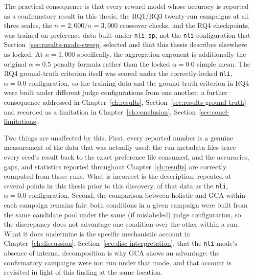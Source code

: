 The practical consequence is that every reward model whose accuracy is
reported as a confirmatory result in this thesis, the RQ1/RQ3 twenty-run
campaigns at all three scales, the $n=2{,}000$/$n=3{,}000$ crossover checks,
and the RQ4 checkpoints, was trained on preference data built under
\texttt{nli\_sp}, not the \texttt{nli} configuration that
Section~\ref{sec:results-mode-sweep} selected and that this thesis describes
elsewhere as locked. At $n=1{,}000$ specifically, the aggregation exponent is
additionally the original $\alpha=0.5$ penalty formula rather than the
locked $\alpha=0.0$ simple mean. The RQ4 ground-truth criterion itself was
scored under the correctly-locked \texttt{nli}, $\alpha=0.0$ configuration,
so the training data and the ground-truth criterion in RQ4 were built under
different judge configurations from one another, a further consequence
addressed in Chapter~\ref{ch:results}, Section~\ref{sec:results-ground-truth}
and recorded as a limitation in Chapter~\ref{ch:conclusion},
Section~\ref{sec:concl-limitations}.

Two things are unaffected by this. First, every reported number is a
genuine measurement of the data that was actually used: the run-metadata
files trace every seed's result back to the exact preference file consumed,
and the accuracies, gaps, and statistics reported throughout
Chapter~\ref{ch:results} are correctly computed from those runs. What is
incorrect is the description, repeated at several points in this thesis
prior to this discovery, of that data as the \texttt{nli}, $\alpha=0.0$
configuration. Second, the comparison between holistic and GCA within each
campaign remains fair: both conditions in a given campaign were built from
the same candidate pool under the same (if mislabeled) judge configuration,
so the discrepancy does not advantage one condition over the other within a
run. What it does undermine is the specific mechanistic account in
Chapter~\ref{ch:discussion}, Section~\ref{sec:disc-interpretation}, that the
\texttt{nli} mode's absence of internal decomposition is why GCA shows an
advantage: the confirmatory campaigns were not run under that mode, and that
account is revisited in light of this finding at the same location.

